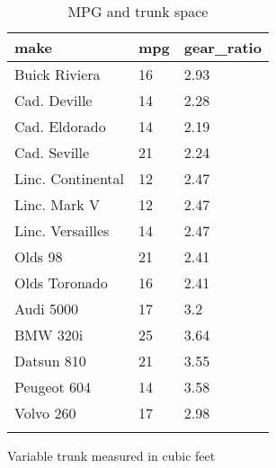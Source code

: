 \documentclass{article}
\begin{document}
\begin{table}[tbp] \centering
{}

\caption{MPG and trunk space}
\begin{tabularx}{\linewidth}{lCC}

\toprule
{make}&{mpg}&{gear\_ratio} \tabularnewline
\midrule \addlinespace[\belowrulesep]
Buick Riviera&16&2.93 \tabularnewline
Cad. Deville&14&2.28 \tabularnewline
Cad. Eldorado&14&2.19 \tabularnewline
Cad. Seville&21&2.24 \tabularnewline
Linc. Continental&12&2.47 \tabularnewline
Linc. Mark V&12&2.47 \tabularnewline
Linc. Versailles&14&2.47 \tabularnewline
Olds 98&21&2.41 \tabularnewline
Olds Toronado&16&2.41 \tabularnewline
Audi 5000&17&3.2 \tabularnewline
BMW 320i&25&3.64 \tabularnewline
Datsun 810&21&3.55 \tabularnewline
Peugeot 604&14&3.58 \tabularnewline
Volvo 260&17&2.98 \tabularnewline
\bottomrule \addlinespace[\belowrulesep]

\end{tabularx}
\begin{flushleft}
\footnotesize Variable trunk measured in cubic feet
\end{flushleft}
\end{table}
\end{document}
